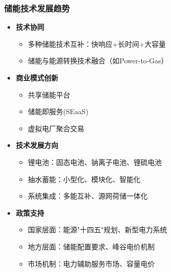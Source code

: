 \documentclass[aspectratio=169]{beamer}
\begin{document}
\begin{frame}
    \frametitle{储能技术发展趋势}
    \begin{itemize}
        \item \textbf{技术协同}
        \begin{itemize}
            \item 多种储能技术互补：快响应+长时间+大容量
            \item 储能与能源转换技术融合（如Power-to-Gas）
        \end{itemize}
        
        \item \textbf{商业模式创新}
        \begin{itemize}
            \item 共享储能平台
            \item 储能即服务(SEaaS)
            \item 虚拟电厂聚合交易
        \end{itemize}
        
        \item \textbf{技术发展方向}
        \begin{itemize}
            \item 锂电池：固态电池、钠离子电池、锂硫电池
            \item 抽水蓄能：小型化、模块化、智能化
            \item 系统集成：多能互补、源网荷储一体化
        \end{itemize}
        
        \item \textbf{政策支持}
        \begin{itemize}
            \item 国家层面：能源"十四五"规划、新型电力系统
            \item 地方层面：储能配置要求、峰谷电价机制
            \item 市场机制：电力辅助服务市场、容量电价
        \end{itemize}
    \end{itemize}
\end{frame}
\end{document}
